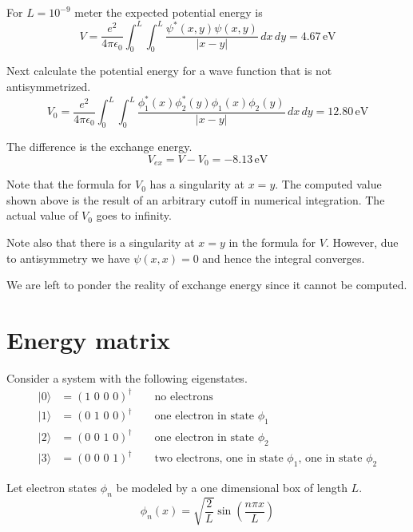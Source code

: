\documentclass[12pt]{article}
\begin{document}
\noindent
For $L=10^{-9}$ meter the expected potential energy is
\begin{equation*}
V=\frac{e^2}{4\pi\epsilon_0}\int_0^L\int_0^L\frac{\psi^*(x,y)\psi(x,y)}{|x-y|}\,dx\,dy
=4.67\,\text{eV}
\end{equation*}

\noindent
Next calculate the potential energy for a wave function that is not antisymmetrized.
\begin{equation*}
V_0=\frac{e^2}{4\pi\epsilon_0}
\int_0^L\int_0^L\frac{\phi_1^*(x)\phi_2^*(y)\phi_1(x)\phi_2(y)}{|x-y|}\,dx\,dy
=12.80\,\text{eV}
\end{equation*}

\noindent
The difference is the exchange energy.
\begin{equation*}
V_{ex}=V-V_0=-8.13\,\text{eV}
\end{equation*}

\noindent
Note that the formula for $V_0$ has a singularity at $x=y$.
The computed value shown above is the result of an arbitrary cutoff in numerical integration.
The actual value of $V_0$ goes to infinity.

\bigskip
\noindent
Note also that there is a singularity at $x=y$ in the formula for $V$.
However, due to antisymmetry we have $\psi(x,x)=0$ and hence the integral converges.

\bigskip
\noindent
We are left to ponder the reality of exchange energy since it cannot be computed.

\newpage

\section{Energy matrix}
Consider a system with the following eigenstates.
\begin{align*}
|0\rangle&=(\text{1 0 0 0})^\dag\qquad\text{no electrons}\\
|1\rangle&=(\text{0 1 0 0})^\dag\qquad\text{one electron in state $\phi_1$}\\
|2\rangle&=(\text{0 0 1 0})^\dag\qquad\text{one electron in state $\phi_2$}\\
|3\rangle&=(\text{0 0 0 1})^\dag\qquad\text{two electrons, one in state $\phi_1$, one in state $\phi_2$}
\end{align*}

\noindent
Let electron states $\phi_n$ be modeled by a one dimensional box of length $L$.
\begin{equation*}
\phi_n(x)=\sqrt{\frac{2}{L}}\sin\left(\frac{n\pi x}{L}\right)
\end{equation*}
\end{document}
